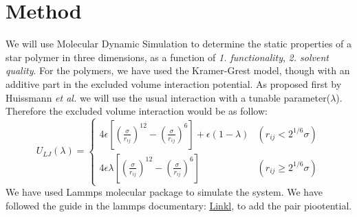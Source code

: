 \section{Method}
We will use Molecular Dynamic Simulation to determine the static properties of a star polymer in three dimensions, as a function of \textit{1. functionality}, \textit{2. solvent quality}.
For the polymers, we have used the Kramer-Grest model, though with an additive part in the excluded volume interaction potential. As proposed first by Huissmann \textit{et al.} we will use the usual interaction with a tunable parameter($\lambda$). Therefore the excluded volume interaction would be as follow:
\begin{equation}
	U_{LJ}(\lambda) =      
	\begin{cases}
		4\epsilon[(\frac{\sigma}{r_{ij}})^{12} - (\frac{\sigma}{r_{ij}})^{6}] 
  + \epsilon(1 - \lambda)
  & (r_{ij}<2^{1/6}\sigma)
  \\
		4\epsilon\lambda[(\frac{\sigma}{r_{ij}})^{12} - (\frac{\sigma}{r_{ij}})^{6}] 
  & (r_{ij}\geq2^{1/6}\sigma)
	\end{cases}
\end{equation}
We have used Lammps molecular package to simulate the system. We have followed the guide in the lammps documentary: 
\hyperlink{https://docs.lammps.org/Developer_write_pair.html}{Linkl}, to add the pair piootential. 
